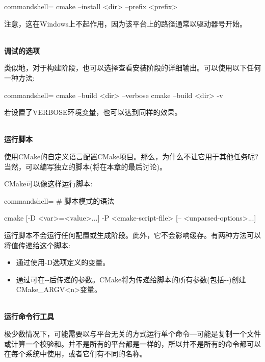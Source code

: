 \begin{tcblisting}{commandshell={}}
cmake --install <dir> --prefix <prefix>
\end{tcblisting}

注意，这在Windows上不起作用，因为该平台上的路径通常以驱动器号开始。

\hspace*{\fill} \\ %
\noindent
\textbf{调试的选项}

类似地，对于构建阶段，也可以选择查看安装阶段的详细输出。可以使用以下任何一种方法:

\begin{tcblisting}{commandshell={}}
cmake --build <dir> --verbose
cmake --build <dir> -v
\end{tcblisting}

若设置了VERBOSE环境变量，也可以达到同样的效果。

\hspace*{\fill} \\ %
\noindent
\textbf{运行脚本}
 
使用CMake的自定义语言配置CMake项目。那么，为什么不让它用于其他任务呢?当然，可以编写独立的脚本(将在本章的最后讨论)。

CMake可以像这样运行脚本:

\begin{tcblisting}{commandshell={}}
# 脚本模式的语法

cmake [{-D <var>=<value>}...] -P <cmake-script-file>
      [-- <unparsed-options>...]
\end{tcblisting}

运行脚本不会运行任何配置或生成阶段。此外，它不会影响缓存。有两种方法可以将值传递给这个脚本:

\begin{itemize}
\item 
通过使用-D选项定义的变量。

\item 
通过可在-{}-后传递的参数。CMake将为传递给脚本的所有参数(包括-{}-)创建CMake\_ARGV<n>变量。
\end{itemize}

\hspace*{\fill} \\ %
\noindent
\textbf{运行命令行工具}

极少数情况下，可能需要以与平台无关的方式运行单个命令—可能是复制一个文件或计算一个校验和。并不是所有的平台都是一样的，所以并不是所有的命令都可以在每个系统中使用，或者它们有不同的名称。

